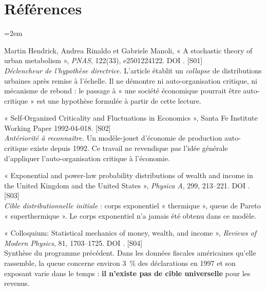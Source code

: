 \section{Références}
\label{sec:biblio}

\begingroup\emergencystretch=2em
\begin{description}[leftmargin=1.6em,style=nextline,itemsep=0.35em]

\item[Hendrick, Rinaldo et Manoli (2025)] Martin Hendrick, Andrea Rinaldo et
  Gabriele Manoli, « A stochastic theory of urban metabolism », \emph{PNAS},
  122(33), e2501224122. DOI . \textsf{[S01]}\\
  \emph{Déclencheur de l'hypothèse directrice.} L'article établit un
  \emph{collapse} de distributions urbaines après remise à l'échelle. Il ne
  démontre ni auto-organisation critique, ni mécanisme de rebond : le passage
  à « une société économique pourrait être auto-critique » est une hypothèse
  formulée à partir de cette lecture.

\item[Bak, Chen, Scheinkman et Woodford (1992)] « Self-Organized Criticality
  and Fluctuations in Economics », Santa Fe Institute Working Paper
  1992-04-018. \textsf{[S02]}\\
  \emph{Antériorité à reconnaître.} Un modèle-jouet d'économie de production
  auto-critique existe depuis 1992. Ce travail ne revendique pas l'idée
  générale d'appliquer l'auto-organisation critique à l'économie.

\item[Drăgulescu et Yakovenko (2001)] « Exponential and power-law probability
  distributions of wealth and income in the United Kingdom and the United
  States », \emph{Physica A}, 299, 213--221. DOI
  . \textsf{[S03]}\\
  \emph{Cible distributionnelle initiale} : corps exponentiel « thermique »,
  queue de Pareto « superthermique ». Le corps exponentiel n'a jamais été
  obtenu dans ce modèle.

\item[Yakovenko et Rosser (2009)] « Colloquium: Statistical mechanics of money,
  wealth, and income », \emph{Reviews of Modern Physics}, 81, 1703--1725. DOI
  . \textsf{[S04]}\\
  Synthèse du programme précédent. Dans les données fiscales américaines
  qu'elle rassemble, la queue concerne environ 3~\% des déclarations en 1997 et
  son exposant varie dans le temps : \textbf{il n'existe pas de cible
  universelle} pour les revenus.


\end{description}

